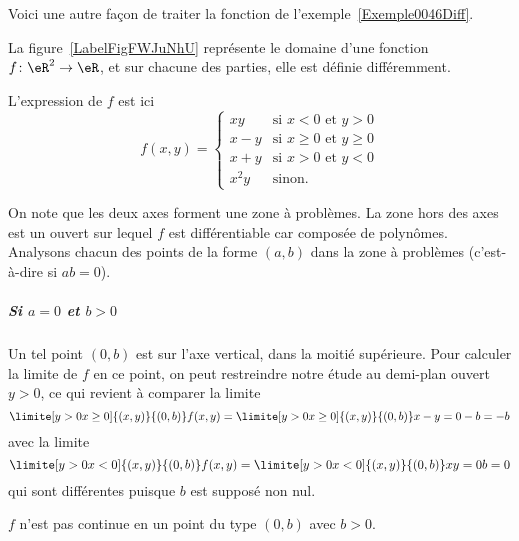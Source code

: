 Voici une autre façon de traiter la fonction de l'exemple~\ref{Exemple0046Diff}.

\begin{example} \label{ExeFHmCLII}
	La figure~\ref{LabelFigFWJuNhU} représente le domaine d'une fonction \( f\colon \eR^2\to \eR\), et sur chacune des parties, elle est définie différemment.
	\newcommand{\CaptionFigFWJuNhU}{La fonction de l'exemple~\ref{ExeFHmCLII}.}
	

	L'expression de \( f\) est ici
	\begin{equation}
		f(x,y) =
		\begin{cases}
			xy   & \text{si } x < 0 \text{ et } y > 0       \\
			x-y  & \text{si } x \geq 0 \text{ et } y \geq 0 \\
			x+y  & \text{si } x > 0 \text{ et } y < 0       \\
			x^2y & \text{sinon.}
		\end{cases}
	\end{equation}

	On note que les deux axes forment une zone à problèmes. La zone hors
	des axes est un ouvert sur lequel \( f\) est différentiable car composée
	de polynômes. Analysons chacun des points de la forme \( (a,b)\) dans la
	zone à problèmes (c'est-à-dire si \( ab = 0\)).

	\subparagraph{Si \( a = 0\) et \( b > 0\)} Un tel point \( (0,b)\) est sur
	l'axe vertical, dans la moitié supérieure. Pour calculer la limite de
	\( f\) en ce point, on peut restreindre notre étude au demi-plan ouvert
	\( y > 0\), ce qui revient à comparer la limite
	\begin{equation*}
		\limite[y>0\\x\geq 0] {(x,y)} {(0,b)} f(x,y) =   \limite[y>0\\x\geq
			0] {(x,y)} {(0,b)} x-y = 0 - b = -b
	\end{equation*}
	avec la limite
	\begin{equation*}
		\limite[y>0\\x<0] {(x,y)} {(0,b)} f(x,y) =   \limite[y>0\\x<0]
		{(x,y)} {(0,b)} xy = 0 b = 0
	\end{equation*}
	qui sont différentes puisque \( b\) est supposé non nul.

	\conclusion \( f\) n'est pas continue en un point du type \( (0,b)\) avec \( b
	> 0\).


\end{example}

